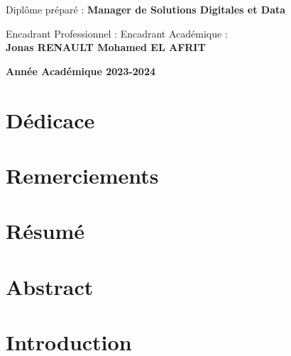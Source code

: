 \documentclass[a4paper, oneside, 12pt, final]{extreport}
\newcommand{\AU} {
\centering \textbf{Année Académique 2023-2024}
}
\begin{document}
\begin{titlepage}
\begin{center}
    \vspace{23pt}
    {Diplôme préparé : \textbf{\large Manager de Solutions Digitales et Data}}\\
    \vspace{46pt}

    Encadrant Professionnel : \hfill Encadrant Académique :\\
    \vspace{10pt}
    \textbf{Jonas RENAULT \hfill Mohamed EL AFRIT}
    \vspace{40pt}

  \end{center}
  \vspace{40pt}
  \AU\\
\end{titlepage}


\chapter*{Dédicace}


\chapter*{Remerciements}


\chapter*{Résumé}



\chapter*{Abstract}


\tableofcontents
{}


\listoffigures
\listoftables
\listofalgorithms
{}
\cleardoublepage

\newpage
{}
\chapter*{Introduction}
\label{chap:intorduction}

\end{document}
